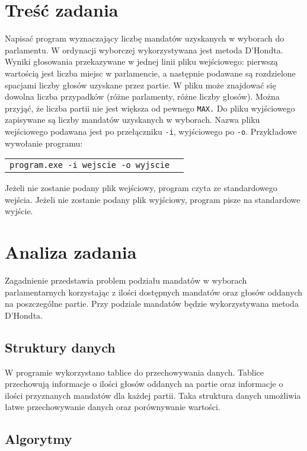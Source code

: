 \documentclass[12pt,a4paper]{article}
\begin{document}
\section{Treść zadania}
Napisać program wyznaczający liczbę mandatów uzyskanych w wyborach do parlamentu. W ordynacji wyborczej wykorzystywana jest metoda D'Hondta. Wyniki głosowania przekazywane w jednej linii pliku wejściowego: pierwszą wartością jest liczba miejsc w parlamencie, a następnie podawane są rozdzielone spacjami liczby głosów uzyskane przez partie. W pliku może znajdować się dowolna liczba przypadków (różne parlamenty, różne liczby głosów). Można przyjąć, że liczba partii nie jest większa od pewnego \texttt{MAX.} Do pliku wyjściowego zapisywane są liczby mandatów uzyskanych w wyborach. Nazwa pliku wejściowego podawana jest po przełączniku \texttt{-i}, wyjściowego po \texttt{-o}. Przykładowe wywołanie programu:

\begin{tabular}{ll}
\texttt{program.exe -i wejscie -o wyjscie}
\end{tabular}

Jeżeli nie zostanie podany plik wejściowy, program czyta ze standardowego wejścia. Jeżeli nie zostanie podany plik wyjściowy, program pisze na standardowe wyjście.

\section{Analiza zadania}

Zagadnienie przedstawia problem podziału mandatów w wyborach parlamentarnych korzystając z ilości dostępnych mandatów oraz głosów oddanych na poszczególne partie. Przy podziale mandatów będzie wykorzystywana metoda D'Hondta.

\subsection{Struktury danych}

W programie wykorzystano tablice do przechowywania danych.
Tablice przechowują informacje o ilości głosów oddanych na partie oraz informacje o ilości przyznanych mandatów dla każdej partii.
Taka struktura danych umożliwia łatwe przechowywanie danych oraz porównywanie wartości.

\subsection{Algorytmy}
\end{document}
